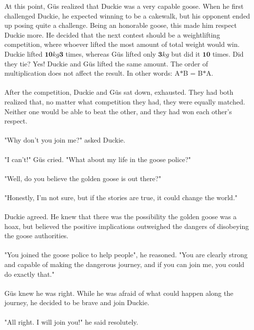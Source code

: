 {}
{At this point, Güs realized that Duckie was a very capable goose. When he first challenged Duckie, he expected winning to be a cakewalk, but his opponent ended up posing quite a challenge. Being an honorable goose, this made him respect Duckie more. He decided that the next contest should be a weightlifting competition, where whoever lifted the most amount of total weight would win. Duckie lifted $\mathbf{10} kg  \mathbf{3}$ times, whereas Güs lifted only $\mathbf{3} kg$ but did it $\mathbf{10}$ times. Did they tie?}
{Yes! Duckie and Güs lifted the same amount.}
{The order of multiplication does not affect the result. In other words: A$\ast$B = B$\ast$A.}
{}
\paragraph{} After the competition, Duckie and Güs sat down, exhausted. They had both realized that, no matter what competition they had, they were equally matched. Neither one would be able to beat the other, and they had won each other's respect. 
\paragraph{} "Why don't you join me?" asked Duckie.
\paragraph{} "I can't!" Güs cried. "What about my life in the goose police?"
\paragraph{} "Well, do you believe the golden goose is out there?"
\paragraph{} "Honestly, I'm not sure, but if the stories are true, it could change the world."
\paragraph{} Duckie agreed. He knew that there was the possibility the golden goose was a hoax, but believed the positive implications outweighed the dangers of disobeying the goose authorities. 
\paragraph{} "You joined the goose police to help people", he reasoned. "You are clearly strong and capable of making the dangerous journey, and if you can join me, you could do exactly that."
\paragraph{} Güs knew he was right. While he was afraid of what could happen along the journey, he decided to be brave and join Duckie. 
\paragraph{} "All right. I will join you!" he said resolutely. 